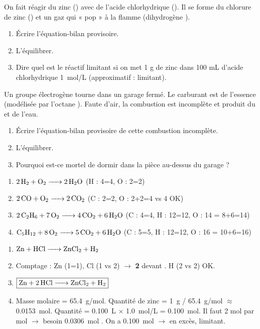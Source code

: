 \documentclass[11pt]{article}
\begin{document}
\begin{exercice}
On fait réagir du zinc () avec de l'acide chlorhydrique (). Il se forme du chlorure de zinc () et un gaz qui « pop » à la flamme (dihydrogène ).
\begin{enumerate}
    \item Écrire l'équation-bilan provisoire.
    \item L'équilibrer.
    \item Dire quel est le réactif limitant si on met 1 g de zinc dans 100 mL d'acide chlorhydrique \SI{1}{mol/L} (approximatif :  limitant).
\end{enumerate}
\end{exercice}

\begin{exercice}
Un groupe électrogène tourne dans un garage fermé. Le carburant est de l'essence (modélisée par l'octane ). Faute d'air, la combustion est incomplète et produit du  et de l'eau.
\begin{enumerate}
    \item Écrire l'équation-bilan provisoire de cette combustion incomplète.
    \item L'équilibrer.
    \item Pourquoi est-ce mortel de dormir dans la pièce au-dessus du garage ?
\end{enumerate}
\end{exercice}

\begin{corrige}[Exercice 1]
\begin{enumerate}
    \item $\ce{2 H2 + O2 -> 2 H2O}$ (H : 4=4, O : 2=2)
    \item $\ce{2 CO + O2 -> 2 CO2}$ (C : 2=2, O : 2+2=4 vs 4 OK)
    \item $\ce{2 C2H6 + 7 O2 -> 4 CO2 + 6 H2O}$ (C : 4=4, H : 12=12, O : 14 = 8+6=14)
    \item $\ce{C5H12 + 8 O2 -> 5 CO2 + 6 H2O}$ (C : 5=5, H : 12=12, O : 16 = 10+6=16)
\end{enumerate}
\end{corrige}

\begin{corrige}[Exercice 2]
\begin{enumerate}
    \item $\ce{Zn + HCl -> ZnCl2 + H2}$
    \item Comptage : Zn (1=1), Cl (1 vs 2) $\rightarrow$ \textbf{2} devant . H (2 vs 2) OK.
    \item $\boxed{\ce{Zn + 2 HCl -> ZnCl2 + H2}}$
    \item Masse molaire  = \SI{65,4}{g/mol}. Quantité de zinc = \SI{1}{g} / \SI{65,4}{g/mol} $\approx$ \SI{0,0153}{mol}. Quantité  = \SI{0,100}{L} $\times$ \SI{1,0}{mol/L} = \SI{0,100}{mol}. Il faut 2 mol  par mol  $\rightarrow$ besoin \SI{0,0306}{mol} . On a \SI{0,100}{mol}  $\rightarrow$  en excès,  limitant.
\end{enumerate}
\end{corrige}
\end{document}
